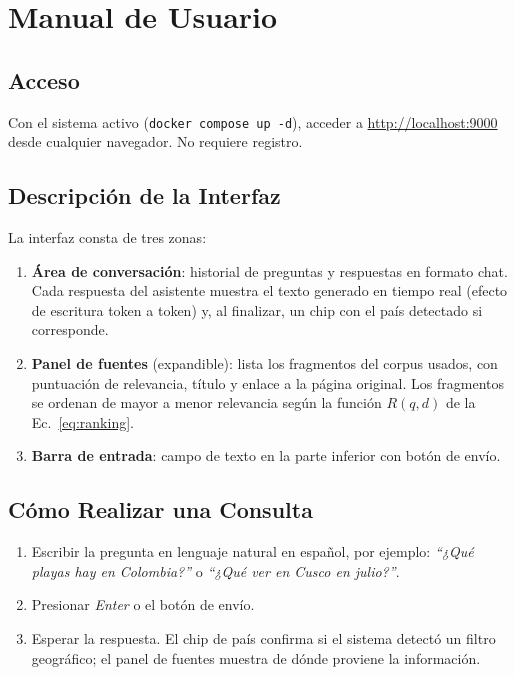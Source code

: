 \documentclass[runningheads]{llncs}
\begin{document}
\section{Manual de Usuario}
\label{sec:manual}

\subsection{Acceso}

Con el sistema activo (\texttt{docker compose up -d}), acceder a
\url{http://localhost:9000} desde cualquier navegador. No requiere
registro.

\subsection{Descripci\'on de la Interfaz}

La interfaz consta de tres zonas:
\begin{enumerate}
  \item \textbf{\'Area de conversaci\'on}: historial de preguntas y
  respuestas en formato chat. Cada respuesta del asistente muestra el
  texto generado en tiempo real (efecto de escritura token a token) y,
  al finalizar, un chip con el pa\'is detectado si corresponde.
  \item \textbf{Panel de fuentes} (expandible): lista los fragmentos del
  corpus usados, con puntuaci\'on de relevancia, t\'itulo y enlace a la
  p\'agina original. Los fragmentos se ordenan de mayor a menor
  relevancia seg\'un la funci\'on $R(q,d)$ de la Ec.~\ref{eq:ranking}.
  \item \textbf{Barra de entrada}: campo de texto en la parte inferior
  con bot\'on de env\'io.
\end{enumerate}

\subsection{C\'omo Realizar una Consulta}

\begin{enumerate}
  \item Escribir la pregunta en lenguaje natural en espa\~nol, por
  ejemplo: \textit{``¿Qu\'e playas hay en Colombia?''} o
  \textit{``¿Qu\'e ver en Cusco en julio?''}.
  \item Presionar \textit{Enter} o el bot\'on de env\'io.
  \item Esperar la respuesta. El chip de pa\'is confirma si el sistema
  detect\'o un filtro geogr\'afico; el panel de fuentes muestra de d\'onde
  proviene la informaci\'on.
\end{enumerate}
\end{document}
